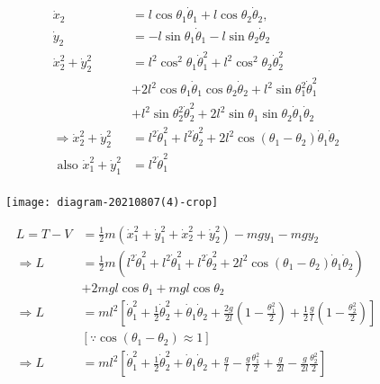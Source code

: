 \begin{enumerate}
\begin{answer}
\begin{minipage}{0.45\textwidth}
\begin{align*}
		\dot{x}_{2}&=l \cos \theta_{1} \dot{\theta}_{1}+l \cos \theta_{2} \dot{\theta}_{2},\\ \dot{y}_{2}&=-l \sin \theta_{1} \dot{\theta}_{1}-l \sin \theta_{2} \dot{\theta}_{2}\\
		\dot{x}_{2}^{2}+\dot{y}_{2}^{2}&=l^{2} \cos ^{2} \theta_{1} \dot{\theta}_{1}^{2}+l^{2} \cos ^{2} \theta_{2} \dot{\theta}_{2}^{2}\\&+2 l^{2} \cos \theta_{1} \dot{\theta}_{1} \cos \theta_{2} \dot{\theta}_{2}+l^{2} \sin \theta_{1}^{2} \dot{\theta}_{1}^{2}
		\\&+l^{2} \sin \theta_{2}^{2} \dot{\theta}_{2}^{2}+2 l^{2} \sin \theta_{1} \sin \theta_{2} \dot{\theta}_{1} \dot{\theta}_{2}\\
		\Rightarrow \dot{x}_{2}^{2}+\dot{y}_{2}^{2}&=l^{2} \dot{\theta}_{1}^{2}+l^{2} \dot{\theta}_{2}^{2}+2 l^{2} \cos \left(\theta_{1}-\theta_{2}\right) \dot{\theta}_{1} \dot{\theta}_{2}\\\text{ also }\dot{x}_{1}^{2}+\dot{y}_{1}^{2}&=l^{2} \dot{\theta}_{1}^{2}\\
		\end{align*}
	\end{minipage}
	\begin{minipage}{0.35\textwidth}
		\begin{figure}[H]
			\centering
			\texttt{[image: diagram-20210807(4)-crop]}
		\end{figure}
	\end{minipage}
	\begin{align*}
	L=T-V&=\frac{1}{2} m\left(\dot{x}_{1}^{2}+\dot{y}_{1}^{2}+\dot{x}_{2}^{2}+\dot{y}_{2}^{2}\right)-m g y_{1}-m g y_{2}\\
	\Rightarrow L&=\frac{1}{2} m\left(l^{2} \dot{\theta}_{1}^{2}+l^{2} \dot{\theta}_{1}^{2}+l^{2} \dot{\theta}_{2}^{2}+2 l^{2} \cos \left(\theta_{1}-\theta_{2}\right) \dot{\theta}_{1} \dot{\theta}_{2}\right)\\&+2 m g l \cos \theta_{1}+m g l \cos \theta_{2}\\
	\Rightarrow L&=m l^{2}\left[\dot{\theta}_{1}^{2}+\frac{1}{2} \dot{\theta}_{2}^{2}+\dot{\theta}_{1} \dot{\theta}_{2}+\frac{2 g}{2 l}\left(1-\frac{\theta_{1}^{2}}{2}\right)+\frac{1}{2} \frac{g}{l}\left(1-\frac{\theta_{2}^{2}}{2}\right)\right]\\&\left[\because \cos \left(\theta_{1}-\theta_{2}\right) \approx 1\right]\\
	\Rightarrow L&=m l^{2}\left[\dot{\theta}_{1}^{2}+\frac{1}{2} \dot{\theta}_{2}^{2}+\dot{\theta}_{1} \dot{\theta}_{2}+\frac{g}{l}-\frac{g}{l} \frac{\theta_{1}^{2}}{2}+\frac{g}{2 l}-\frac{g}{2 l} \frac{\theta_{2}^{2}}{2}\right]

\end{align*}
\end{answer}
\end{enumerate}
